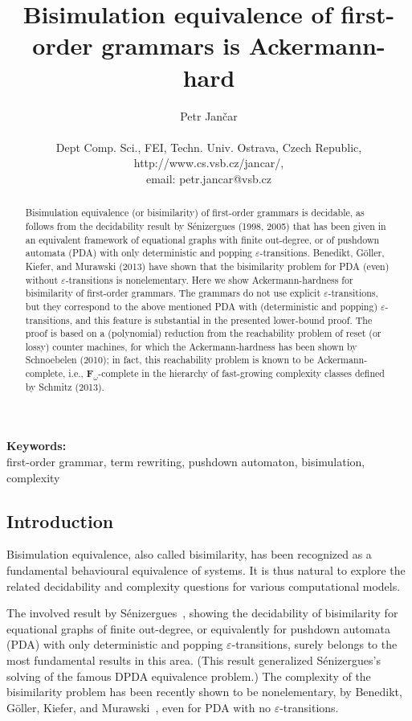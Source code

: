 \documentclass[a4paper,11pt]{article}
\title{Bisimulation equivalence  
	of first-order grammars is Ackermann-hard}
\author{Petr Jan\v{c}ar\\
 \ \\
Dept Comp. Sci., FEI,	Techn. Univ. Ostrava, Czech Republic,
 \\
 http://www.cs.vsb.cz/jancar/,
 \\
 email: petr.jancar@vsb.cz
}
\date{}
\begin{document}
\maketitle


\begin{abstract}
\noindent	
Bisimulation equivalence 
(or bisimilarity)
of
first-order grammars is decidable, as follows from  
the decidability result 
by S\'enizergues (1998, 2005) that has been given
in an equivalent framework of 
equational graphs with finite out-degree, or of 
pushdown automata (PDA)
with
only deterministic and popping $\varepsilon$-transitions.
Benedikt, G\"oller, Kiefer, and Murawski (2013) have shown that the
bisimilarity problem for PDA (even) without $\varepsilon$-transitions is
nonelementary. 
Here we show Ackermann-hardness for bisimilarity of first-order grammars. 
The grammars do not use explicit $\varepsilon$-transitions, but they
correspond to the above mentioned PDA with (deterministic and popping)  
$\varepsilon$-transitions, and this feature is substantial in the
presented lower-bound proof.
The proof is based on
a (polynomial) reduction from the reachability problem of reset (or
lossy) counter machines, for which  the Ackermann-hardness has been
shown by Schnoebelen (2010); in fact, this reachability problem is known to be 
Ackermann-complete, i.e.,
$\mathbf{F}_\omega$-complete in the hierarchy of fast-growing
complexity classes defined by Schmitz (2013).
\end{abstract}

\noindent
\textbf{Keywords:}
\\
first-order grammar, term rewriting, pushdown
automaton, bisimulation, complexity 


\subsection*{Introduction}

Bisimulation equivalence, 
also called bisimilarity, has been recognized as a fundamental behavioural equivalence 
of systems. It is thus natural to explore the related decidability and
complexity questions for various computational models. 

The involved result by S\'enizergues~\cite{Seni05}, showing the decidability of
bisimilarity for equational graphs of finite out-degree, or
equivalently for 
pushdown automata (PDA)
with
only deterministic and popping $\varepsilon$-transitions, surely
belongs to the most fundamental results in this area. (This result
generalized S\'enizergues's solving of the famous DPDA equivalence
problem.)
The complexity of the bisimilarity problem has been recently shown to
be nonelementary, by
Benedikt, G\"oller, Kiefer, and Murawski~\cite{BGKM12}, even for PDA
with no $\varepsilon$-transitions.
\end{document}
